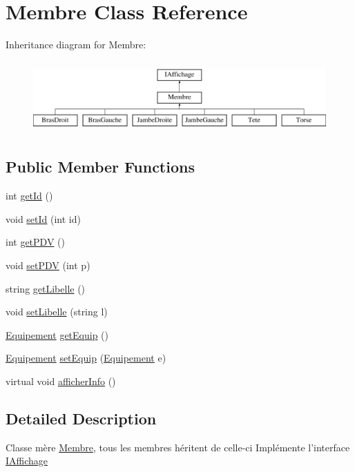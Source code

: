 \hypertarget{class_membre}{\section{\-Membre \-Class \-Reference}
\label{class_membre}
}
\-Inheritance diagram for \-Membre\-:\begin{figure}[H]
\begin{center}
\leavevmode
\includegraphics[height=2.772277cm]{class_membre}
\end{center}
\end{figure}
\subsection*{\-Public \-Member \-Functions}
\begin{DoxyCompactItemize}
\item 
int \hyperlink{class_membre_aa4ba3c5babf132246cc84907c37e3738}{get\-Id} ()
\item 
void \hyperlink{class_membre_a4b87bebc56e82f08d4ebdf8bcf773c11}{set\-Id} (int id)
\item 
int \hyperlink{class_membre_a35ddd831b2ca01dd13be213470f2aa65}{get\-P\-D\-V} ()
\item 
void \hyperlink{class_membre_a6b45657cd705c02a6ab5a338d1204f3e}{set\-P\-D\-V} (int p)
\item 
string \hyperlink{class_membre_a6ef6931754fe7ce7e8101bf27bc3ef6a}{get\-Libelle} ()
\item 
void \hyperlink{class_membre_aaffef4990f332871cd1dd9b3fc03a078}{set\-Libelle} (string l)
\item 
\hyperlink{class_equipement}{\-Equipement} \hyperlink{class_membre_a8b57b95b91806ebf6171624ac0a051cb}{get\-Equip} ()
\item 
\hyperlink{class_equipement}{\-Equipement} \hyperlink{class_membre_ab2f78da0480458242168b57cf33e3f7c}{set\-Equip} (\hyperlink{class_equipement}{\-Equipement} e)
\item 
virtual void \hyperlink{class_membre_adc88d8e745a6a46a90722ea2397598c9}{afficher\-Info} ()
\end{DoxyCompactItemize}


\subsection{\-Detailed \-Description}
\-Classe mère \hyperlink{class_membre}{\-Membre}, tous les membres héritent de celle-\/ci \-Implémente l'interface \hyperlink{class_i_affichage}{\-I\-Affichage} 

